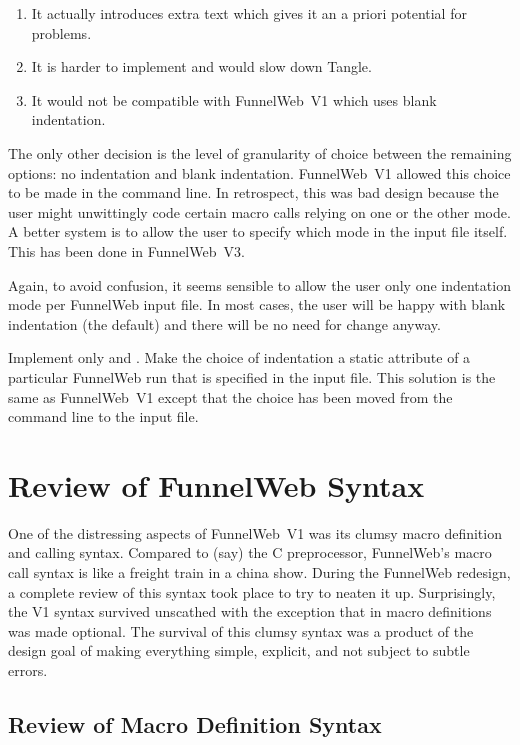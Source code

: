 \begin{enumerate}
\item It actually introduces extra text which gives it an a priori
      potential for problems.
\item It is harder to implement and would slow down Tangle.
\item It would not be compatible with FunnelWeb~V1 which uses blank
      indentation.
\end{enumerate}

The only other decision is the level of granularity of choice between the
remaining options: no indentation and blank indentation. FunnelWeb~V1
allowed this choice to be made in the command line. In retrospect, this
was bad design because the user might unwittingly code certain macro calls
relying on one or the other mode. A better system is to allow the user
to specify which mode in the input file itself. This has been done in
FunnelWeb~V3.

Again, to avoid confusion, it seems sensible to allow the user only
one indentation mode per FunnelWeb input file. In most cases, the user
will be happy with blank indentation (the default) and there will be
no need for change anyway.

 Implement only  and .
Make the
choice of indentation a static attribute of a particular FunnelWeb run
that is specified in the input file. This solution is the same as FunnelWeb~V1
except that the choice has been moved from the command line to the
input file.

\section{Review of FunnelWeb Syntax}

One of the distressing aspects of FunnelWeb~V1 was its clumsy macro
definition and calling syntax.
Compared to (say) the C preprocessor, FunnelWeb's macro call syntax is
like a freight train in a china show.
During the FunnelWeb redesign, a complete review of this syntax took place to
try to neaten it up. Surprisingly, the V1 syntax survived unscathed
with the exception that \dqp{==}\x{==} in macro definitions was made optional.
The survival of this clumsy syntax was a product of the design goal of
making everything simple, explicit, and not subject to subtle errors.

\subsection{Review of Macro Definition Syntax}

